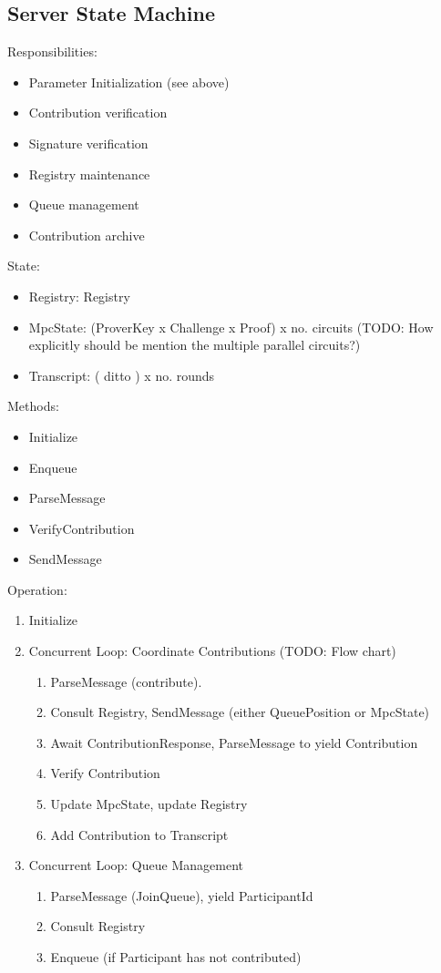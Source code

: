 \subsection{Server State Machine}
Responsibilities:
\begin{itemize}
    \item Parameter Initialization (see above)
    \item Contribution verification
    \item Signature verification 
    \item Registry maintenance
    \item Queue management
    \item Contribution archive 
\end{itemize}
State: 
\begin{itemize}
    \item Registry: Registry
    \item MpcState: (ProverKey x Challenge x Proof) x no. circuits (TODO: How explicitly should be mention the multiple parallel circuits?)
    \item Transcript: ( ditto ) x no. rounds
\end{itemize}
Methods:
\begin{itemize}
    \item Initialize
    \item Enqueue 
    \item ParseMessage
    \item VerifyContribution
    \item SendMessage
\end{itemize}
Operation:
\begin{enumerate}
    \item Initialize
    \item Concurrent Loop: Coordinate Contributions (TODO: Flow chart)
    \begin{enumerate}
        \item ParseMessage (contribute). 
        \item Consult Registry, SendMessage (either QueuePosition or MpcState) 
        \item Await ContributionResponse, ParseMessage to yield Contribution
        \item Verify Contribution 
        \item Update MpcState, update Registry
        \item Add Contribution to Transcript
    \end{enumerate}
    \item Concurrent Loop: Queue Management
    \begin{enumerate}
        \item ParseMessage (JoinQueue), yield ParticipantId
        \item Consult Registry
        \item Enqueue (if Participant has not contributed)
    \end{enumerate}
\end{enumerate}

